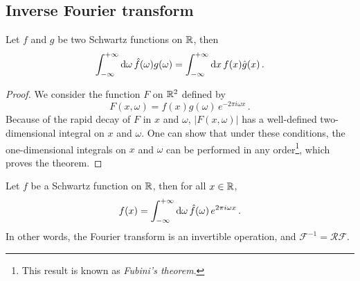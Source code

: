 \subsection{Inverse Fourier transform}
\begin{theorem}
  \label{thm:fourier-adj}
  Let $f$ and $g$ be two Schwartz functions on $\mathbb{R}$, then
  \begin{equation}
    \int_{-\infty}^{+\infty}\mathrm{d}{\omega}\,\hat{f}(\omega)g(\omega)=\int_{-\infty}^{+\infty}\mathrm{d}{x}\,f(x)\hat{g}(x)\,.
  \end{equation}
\end{theorem}
\begin{proof}
  We consider the function $F$ on $\mathbb{R}^2$ defined by
  \begin{equation}
    F(x,\omega)=f(x)g(\omega)\,e^{-2\pi i\omega x}\,.
  \end{equation}
  Because of the rapid decay of $F$ in $x$ and $\omega$, $|F(x,\omega)|$ has a
  well-defined two-dimensional integral on $x$ and $\omega$. One can show that under these
  conditions, the one-dimensional integrals on $x$ and $\omega$ can be performed in any
  order\footnote{This result is known as \emph{Fubini's theorem}.}, which proves the
  theorem.
\end{proof}
\begin{theorem}
  \label{thm:fourier-inv}
  Let $f$ be a Schwartz function on $\mathbb{R}$, then for all $x\in\mathbb{R}$,
  \begin{equation}
    f(x)=\int_{-\infty}^{+\infty}\mathrm{d}{\omega}\,\hat{f}(\omega)\,e^{2\pi i\omega x}\,.
  \end{equation}
  In other words, the Fourier transform is an invertible operation, and
  $\mathcal{F}^{-1}=\mathcal{R}\mathcal{F}$.
\end{theorem}
